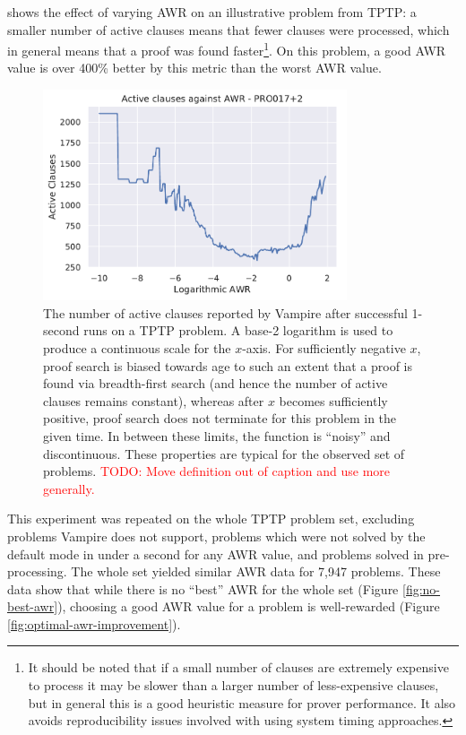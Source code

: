 \documentclass{llncs}
\newcommand{\todo}[1]{\textcolor{red}{TODO: #1}}
\begin{document}
  shows the effect of varying AWR on an illustrative problem from TPTP: a smaller number of active clauses means that fewer clauses were processed, which in general means that a proof was found faster\footnote{
It should be noted that if a small number of clauses are extremely expensive to process it may be slower than a larger number of less-expensive clauses, but in general this is a good heuristic measure for prover performance.
It also avoids reproducibility issues involved with using system timing approaches.
}.
On this problem, a good AWR value is over 400\% better by this metric than the worst AWR value.

\begin{figure}[t]
	\centering
	\includegraphics[width=0.8\textwidth]{example-optimal-awr}
	\caption{
The number of active clauses reported by Vampire after successful 1-second runs on a TPTP problem.
A base-2 logarithm is used to produce a continuous scale for the \(x\)-axis.
For sufficiently negative \(x\), proof search is biased towards age to such an extent that a proof is found via breadth-first search (and hence the number of active clauses remains constant), whereas after \(x\) becomes sufficiently positive, proof search does not terminate for this problem in the given time.
In between these limits, the function is ``noisy'' and discontinuous.
These properties are typical for the observed set of problems. \todo{Move definition out of caption and use more generally.}
}
	\label{fig:example-optimal-awr}
\end{figure}

This experiment was repeated on the whole TPTP problem set, excluding problems Vampire does not support, problems which were not solved by the default mode in under a second for any AWR value, and problems solved in pre-processing.
The whole set yielded similar AWR data for 7,947 problems.
These data show that while there is no ``best'' AWR for the whole set (Figure \ref{fig:no-best-awr}), choosing a good AWR value for a problem is well-rewarded (Figure \ref{fig:optimal-awr-improvement}).
\end{document}
